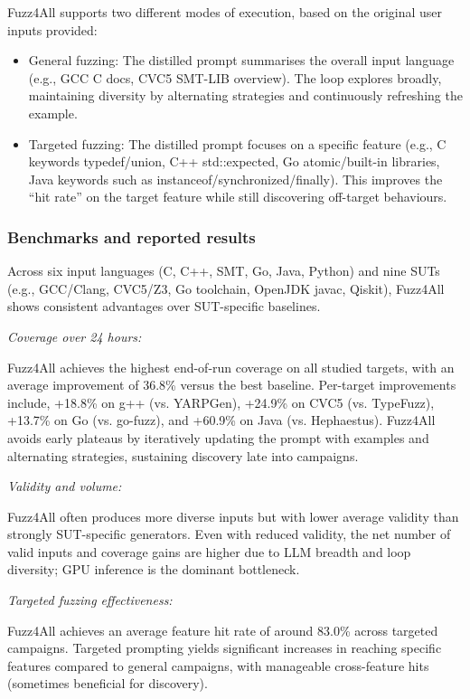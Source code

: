 Fuzz4All supports two different modes of execution, based on the original user inputs provided:

\begin{itemize}
    \item General fuzzing: The distilled prompt summarises the overall input language (e.g., GCC C docs, CVC5 SMT-LIB overview). The loop explores broadly, maintaining diversity by alternating strategies and continuously refreshing the example.

    \item Targeted fuzzing: The distilled prompt focuses on a specific feature (e.g., C keywords typedef/union, C++ std::expected, Go atomic/built-in libraries, Java keywords such as instanceof/synchronized/finally). This improves the ``hit rate'' on the target feature while still discovering off-target behaviours.
\end{itemize}

\subsubsection{Benchmarks and reported results}

Across six input languages (C, C++, SMT, Go, Java, Python) and nine SUTs (e.g., GCC/Clang, CVC5/Z3, Go toolchain, OpenJDK javac, Qiskit), Fuzz4All shows consistent advantages over SUT-specific baselines.

\lilspace
\textit{Coverage over 24 hours:}

Fuzz4All achieves the highest end-of-run coverage on all studied targets, with an average improvement of 36.8\% versus the best baseline. Per-target improvements include, +18.8\% on g++ (vs. YARPGen), +24.9\% on CVC5 (vs. TypeFuzz), +13.7\% on Go (vs. go-fuzz), and +60.9\% on Java (vs. Hephaestus). Fuzz4All avoids early plateaus by iteratively updating the prompt with examples and alternating strategies, sustaining discovery late into campaigns.

\lilspace
\textit{Validity and volume:}

\sloppy
Fuzz4All often produces more diverse inputs but with lower average validity than strongly SUT-specific generators. Even with reduced validity, the net number of valid inputs and coverage gains are higher due to LLM breadth and loop diversity; GPU inference is the dominant bottleneck.

\lilspace
\textit{Targeted fuzzing effectiveness:}

Fuzz4All achieves an average feature hit rate of around 83.0\% across targeted campaigns. Targeted prompting yields significant increases in reaching specific features compared to general campaigns, with manageable cross-feature hits (sometimes beneficial for discovery).

